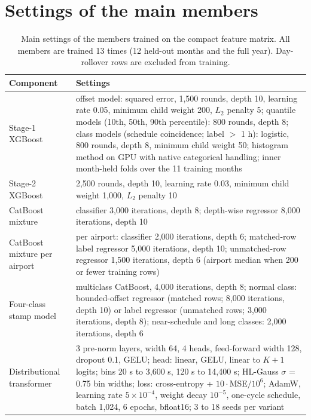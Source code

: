 \documentclass[
  manuscript=article,  %
  layout=preprint,  %
  year=20xx,
  volume=x,
]{extra/joas}
\begin{document}
\appendix

\section{Settings of the main members}
\label{app:settings}

\begin{table}[htbp!]
  \centering
  \small
  \caption{Main settings of the members trained on the compact feature matrix. All members are trained 13 times (12 held-out months and the full year). Day-rollover rows are excluded from training.}
  \label{tb:settings}
  \begin{tabular}{p{}p{}}
  \toprule
  \textbf{Component} & \textbf{Settings} \\
  \midrule
  Stage-1 XGBoost & offset model: squared error, 1,500 rounds, depth 10, learning rate 0.05, minimum child weight 200, $L_2$ penalty 5; quantile models (10th, 50th, 90th percentile): 800 rounds, depth 8; class models (schedule coincidence; label $>$ 1 h): logistic, 800 rounds, depth 8, minimum child weight 50; histogram method on GPU with native categorical handling; inner month-held folds over the 11 training months \\
  Stage-2 XGBoost & 2,500 rounds, depth 10, learning rate 0.03, minimum child weight 1,000, $L_2$ penalty 10 \\
  CatBoost mixture & classifier 3,000 iterations, depth 8; depth-wise regressor 8,000 iterations, depth 10 \\
  CatBoost mixture per airport & per airport: classifier 2,000 iterations, depth 6; matched-row label regressor 5,000 iterations, depth 10; unmatched-row regressor 1,500 iterations, depth 6 (airport median when 200 or fewer training rows) \\
  Four-class stamp model & multiclass CatBoost, 4,000 iterations, depth 8; normal class: bounded-offset regressor (matched rows; 8,000 iterations, depth 10) or label regressor (unmatched rows; 3,000 iterations, depth 8); near-schedule and long classes: 2,000 iterations, depth 6 \\
  Distributional transformer & 3 pre-norm layers, width 64, 4 heads, feed-forward width 128, dropout 0.1, GELU; head: linear, GELU, linear to $K+1$ logits; bins 20 s to 3,600 s, 120 s to 14,400 s; HL-Gauss $\sigma$ = 0.75 bin widths; loss: cross-entropy + $10\cdot$MSE$/10^6$; AdamW, learning rate $5\times10^{-4}$, weight decay $10^{-5}$, one-cycle schedule, batch 1,024, 6 epochs, bfloat16; 3 to 18 seeds per variant \\

\end{tabular}
\end{table}
\end{document}
